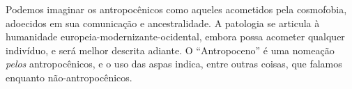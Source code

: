 Podemos imaginar os antropocênicos como aqueles acometidos pela cosmofobia, adoecidos em sua comunicação e ancestralidade. A patologia se articula à humanidade europeia-modernizante-ocidental, embora possa acometer qualquer indivíduo, e será melhor descrita adiante. O \enquote{Antropoceno} é uma nomeação \textit{pelos} antropocênicos, e o uso das aspas indica, entre outras coisas, que falamos enquanto não-antropocênicos.